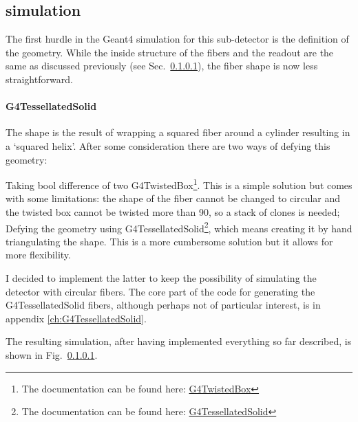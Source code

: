 \begin{refsection}
    \subsection{\gf simulation}
        The first hurdle in the Geant4 simulation for this sub-detector is the definition of the geometry.
        While the inside structure of the fibers and the readout are the same as discussed previously (see Sec.~\ref{}), the fiber shape is now less straightforward.
        
        \paragraph{G4TessellatedSolid}
        The shape is the result of wrapping a squared fiber around a cylinder resulting in a `squared helix'.
        After some consideration there are two ways of defying this geometry:
        \begin{outline}
            \1 Taking bool difference of two G4TwistedBox\footnote{The documentation can be found here: \href{https://apc.u-paris.fr/~franco/g4doxy/html/classG4TwistedBox.html}{G4TwistedBox}}. 
            This is a simple solution but comes with some limitations: the shape of the fiber cannot be changed to circular and the twisted box cannot be twisted more than \SI{90}{\deg}, so a stack of clones is needed; 
            \1 Defying the geometry using G4TessellatedSolid\footnote{The documentation can be found here: \href{https://apc.u-paris.fr/~franco/g4doxy/html/classG4TessellatedSolid.html}{G4TessellatedSolid}}, which means creating it by hand triangulating the shape. This is a more cumbersome solution but it allows for more flexibility.
        \end{outline}
        I decided to implement the latter to keep the possibility of simulating the detector with circular fibers.
        The core part of the code for generating the G4TessellatedSolid fibers, although perhaps not of particular interest, is in appendix \ref{ch:G4TessellatedSolid}.

        The resulting simulation, after having implemented everything so far described, is shown in Fig.~\ref{}.
        

\end{refsection}
